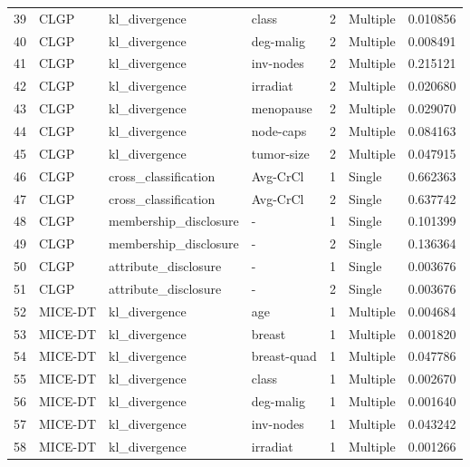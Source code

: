 \begin{tabular}{llllrlr}
39  &     CLGP &          kl\_divergence &        class &    2 &  Multiple &  0.010856 \\
40  &     CLGP &          kl\_divergence &    deg-malig &    2 &  Multiple &  0.008491 \\
41  &     CLGP &          kl\_divergence &    inv-nodes &    2 &  Multiple &  0.215121 \\
42  &     CLGP &          kl\_divergence &     irradiat &    2 &  Multiple &  0.020680 \\
43  &     CLGP &          kl\_divergence &    menopause &    2 &  Multiple &  0.029070 \\
44  &     CLGP &          kl\_divergence &    node-caps &    2 &  Multiple &  0.084163 \\
45  &     CLGP &          kl\_divergence &   tumor-size &    2 &  Multiple &  0.047915 \\
46  &     CLGP &   cross\_classification &     Avg-CrCl &    1 &    Single &  0.662363 \\
47  &     CLGP &   cross\_classification &     Avg-CrCl &    2 &    Single &  0.637742 \\
48  &     CLGP &  membership\_disclosure &            - &    1 &    Single &  0.101399 \\
49  &     CLGP &  membership\_disclosure &            - &    2 &    Single &  0.136364 \\
50  &     CLGP &   attribute\_disclosure &            - &    1 &    Single &  0.003676 \\
51  &     CLGP &   attribute\_disclosure &            - &    2 &    Single &  0.003676 \\
52  &  MICE-DT &          kl\_divergence &          age &    1 &  Multiple &  0.004684 \\
53  &  MICE-DT &          kl\_divergence &       breast &    1 &  Multiple &  0.001820 \\
54  &  MICE-DT &          kl\_divergence &  breast-quad &    1 &  Multiple &  0.047786 \\
55  &  MICE-DT &          kl\_divergence &        class &    1 &  Multiple &  0.002670 \\
56  &  MICE-DT &          kl\_divergence &    deg-malig &    1 &  Multiple &  0.001640 \\
57  &  MICE-DT &          kl\_divergence &    inv-nodes &    1 &  Multiple &  0.043242 \\
58  &  MICE-DT &          kl\_divergence &     irradiat &    1 &  Multiple &  0.001266 \\

\end{tabular}
